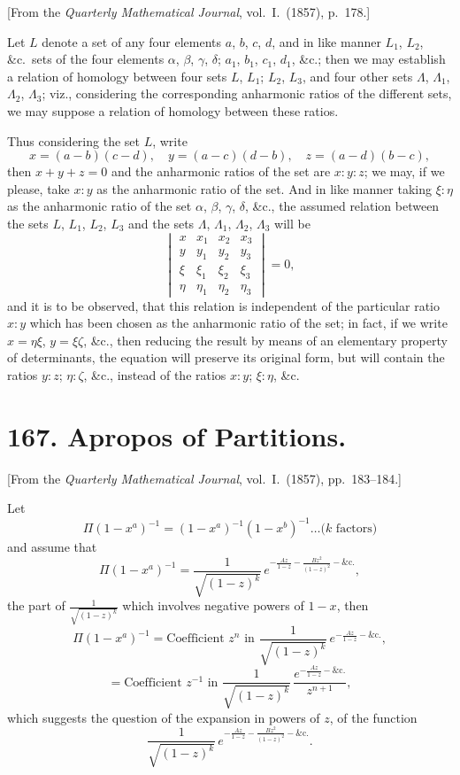 \documentclass[11pt,a4paper]{article}
\theoremstyle{plain}
\begin{document}
[From the \textit{Quarterly Mathematical Journal}, vol.~I.~(1857), p.~178.]

Let $L$ denote a set of any four elements $a$, $b$, $c$, $d$, and in like manner $L_1$, $L_2$, \&c.\ sets of the four elements $\alpha$, $\beta$, $\gamma$, $\delta$; $a_1$, $b_1$, $c_1$, $d_1$, \&c.; then we may establish a relation of homology between four sets $L$, $L_1$; $L_2$, $L_3$, and four other sets $\Lambda$, $\Lambda_1$, $\Lambda_2$, $\Lambda_3$; viz., considering the corresponding anharmonic ratios of the different sets, we may suppose a relation of homology between these ratios.

Thus considering the set $L$, write
\[
x = (a-b)(c-d),\quad y = (a-c)(d-b),\quad z = (a-d)(b-c),
\]
then $x+y+z=0$ and the anharmonic ratios of the set are $x:y:z$; we may, if we please, take $x:y$ as the anharmonic ratio of the set. And in like manner taking $\xi:\eta$ as the anharmonic ratio of the set $\alpha$, $\beta$, $\gamma$, $\delta$, \&c., the assumed relation between the sets $L$, $L_1$, $L_2$, $L_3$ and the sets $\Lambda$, $\Lambda_1$, $\Lambda_2$, $\Lambda_3$ will be
\[
\begin{vmatrix}
x & x_1 & x_2 & x_3 \\
y & y_1 & y_2 & y_3 \\
\xi & \xi_1 & \xi_2 & \xi_3 \\
\eta & \eta_1 & \eta_2 & \eta_3
\end{vmatrix} = 0,
\]
and it is to be observed, that this relation is independent of the particular ratio $x:y$ which has been chosen as the anharmonic ratio of the set; in fact, if we write $x=\eta\xi$, $y=\xi\zeta$, \&c., then reducing the result by means of an elementary property of determinants, the equation will preserve its original form, but will contain the ratios $y:z$; $\eta:\zeta$, \&c., instead of the ratios $x:y$; $\xi:\eta$, \&c.


\newpage
\section*{167. Apropos of Partitions.}

[From the \textit{Quarterly Mathematical Journal}, vol.~I.~(1857), pp.~183--184.]

Let
\[
\Pi(1-x^a)^{-1} = (1-x^a)^{-1}(1-x^b)^{-1}\ldots\text{($k$ factors)}
\]
and assume that
\[
\Pi(1-x^a)^{-1} = \frac{1}{\sqrt{(1-z)^k}}\, e^{-\frac{Az}{1-z}-\frac{Bz^2}{(1-z)^2}-\&\text{c.}},
\]
the part of $\frac{1}{\sqrt{(1-z)^k}}$ which involves negative powers of $1-x$, then
\[
\Pi(1-x^a)^{-1} = \text{Coefficient } z^n \text{ in } \frac{1}{\sqrt{(1-z)^k}}\, e^{-\frac{Az}{1-z}-\&\text{c.}},
\]
\[
= \text{Coefficient } z^{-1} \text{ in } \frac{1}{\sqrt{(1-z)^k}}\, \frac{e^{-\frac{Az}{1-z}-\&\text{c.}}}{z^{n+1}},
\]
which suggests the question of the expansion in powers of $z$, of the function
\[
\frac{1}{\sqrt{(1-z)^k}}\, e^{-\frac{Az}{1-z}-\frac{Bz^2}{(1-z)^2}-\&\text{c.}}.
\]
\end{document}
